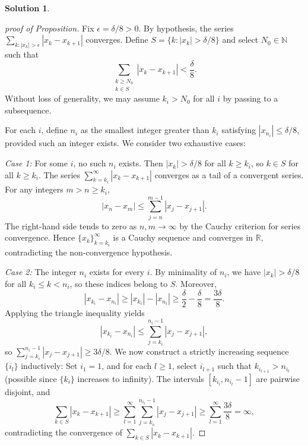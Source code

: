 \documentclass[12pt]{article}
\theoremstyle{definition}
\newtheorem*{solution}{\normalfont\textbf{Solution}}
\begin{document}
\begin{enumerate}[leftmargin=*]
\begin{solution}
\begin{proof}[proof of Proposition]
                    Fix \(\epsilon = \delta/8 > 0\). By hypothesis, the series \(\sum_{k : |x_k| > \epsilon} |x_k - x_{k+1}|\) converges. Define \(S = \{k : |x_k| > \delta/8\}\) and select \(N_0 \in \mathbb{N}\) such that 
                    \[
                    \sum_{\substack{k \geq N_0 \\ k \in S}} |x_k - x_{k+1}| < \frac{\delta}{8}.
                    \]
                    Without loss of generality, we may assume \(k_i > N_0\) for all \(i\) by passing to a subsequence.

                    For each \(i\), define \(n_i\) as the smallest integer greater than \(k_i\) satisfying \(|x_{n_i}| \leq \delta/8\), provided such an integer exists. We consider two exhaustive cases:

                    \textit{Case 1:}  For some \(i\), no such \(n_i\) exists. Then \(|x_k| > \delta/8\) for all \(k \geq k_i\), so \(k \in S\) for all \(k \geq k_i\). The series \(\sum_{k=k_i}^{\infty} |x_k - x_{k+1}|\) converges as a tail of a convergent series. For any integers \(m > n \geq k_i\),
                    \[
                    |x_n - x_m| \leq \sum_{j=n}^{m-1} |x_j - x_{j+1}|.
                    \]
                    The right-hand side tends to zero as \(n, m \to \infty\) by the Cauchy criterion for series convergence. Hence \(\{x_k\}_{k=k_i}^{\infty}\) is a Cauchy sequence and converges in \(\mathbb{R}\), contradicting the non-convergence hypothesis.

                    \textit{Case 2:}  The integer \(n_i\) exists for every \(i\). By minimality of \(n_i\), we have \(|x_k| > \delta/8\) for all \(k_i \leq k < n_i\), so these indices belong to \(S\). Moreover,
                    \[
                    |x_{k_i} - x_{n_i}| \geq |x_{k_i}| - |x_{n_i}| \geq \frac{\delta}{2} - \frac{\delta}{8} = \frac{3\delta}{8}.
                    \]
                    Applying the triangle inequality yields
                    \[
                    |x_{k_i} - x_{n_i}| \leq \sum_{j=k_i}^{n_i-1} |x_j - x_{j+1}|,
                    \]
                    so \(\sum_{j=k_i}^{n_i-1} |x_j - x_{j+1}| \geq 3\delta/8\). We now construct a strictly increasing sequence \(\{i_l\}\) inductively: Set \(i_1 = 1\), and for each \(l \geq 1\), select \(i_{l+1}\) such that \(k_{i_{l+1}} > n_{i_l}\) (possible since \(\{k_i\}\) increases to infinity). The intervals \([k_{i_l}, n_{i_l}-1]\) are pairwise disjoint, and
                    \[
                    \sum_{k \in S} |x_k - x_{k+1}| \geq \sum_{l=1}^{\infty} \sum_{j=k_{i_l}}^{n_{i_l}-1} |x_j - x_{j+1}| \geq \sum_{l=1}^{\infty} \frac{3\delta}{8} = \infty,
                    \]
                    contradicting the convergence of \(\sum_{k \in S} |x_k - x_{k+1}|\).


\end{proof}
\end{solution}
\end{enumerate}
\end{document}
